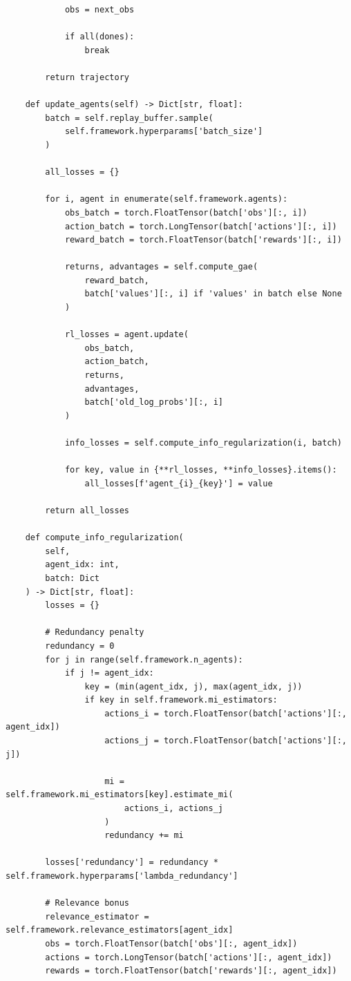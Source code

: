 \documentclass[10pt, letterpaper]{article}
\begin{document}
\begin{lstlisting}
            obs = next_obs

            if all(dones):
                break

        return trajectory

    def update_agents(self) -> Dict[str, float]:
        batch = self.replay_buffer.sample(
            self.framework.hyperparams['batch_size']
        )

        all_losses = {}

        for i, agent in enumerate(self.framework.agents):
            obs_batch = torch.FloatTensor(batch['obs'][:, i])
            action_batch = torch.LongTensor(batch['actions'][:, i])
            reward_batch = torch.FloatTensor(batch['rewards'][:, i])

            returns, advantages = self.compute_gae(
                reward_batch,
                batch['values'][:, i] if 'values' in batch else None
            )

            rl_losses = agent.update(
                obs_batch,
                action_batch,
                returns,
                advantages,
                batch['old_log_probs'][:, i]
            )

            info_losses = self.compute_info_regularization(i, batch)

            for key, value in {**rl_losses, **info_losses}.items():
                all_losses[f'agent_{i}_{key}'] = value

        return all_losses

    def compute_info_regularization(
        self,
        agent_idx: int,
        batch: Dict
    ) -> Dict[str, float]:
        losses = {}

        # Redundancy penalty
        redundancy = 0
        for j in range(self.framework.n_agents):
            if j != agent_idx:
                key = (min(agent_idx, j), max(agent_idx, j))
                if key in self.framework.mi_estimators:
                    actions_i = torch.FloatTensor(batch['actions'][:, agent_idx])
                    actions_j = torch.FloatTensor(batch['actions'][:, j])

                    mi = self.framework.mi_estimators[key].estimate_mi(
                        actions_i, actions_j
                    )
                    redundancy += mi

        losses['redundancy'] = redundancy * self.framework.hyperparams['lambda_redundancy']

        # Relevance bonus
        relevance_estimator = self.framework.relevance_estimators[agent_idx]
        obs = torch.FloatTensor(batch['obs'][:, agent_idx])
        actions = torch.LongTensor(batch['actions'][:, agent_idx])
        rewards = torch.FloatTensor(batch['rewards'][:, agent_idx])


\end{lstlisting}
\end{document}
